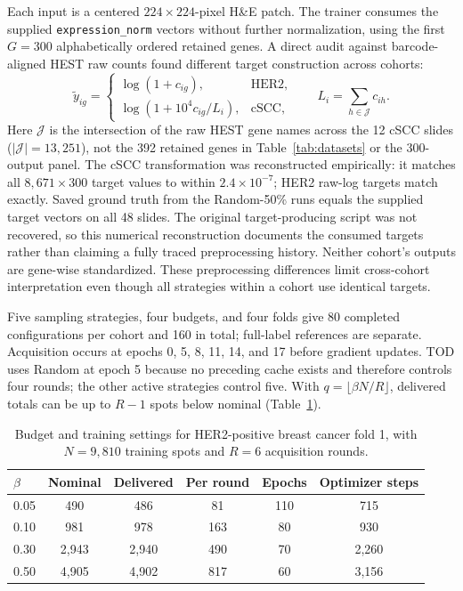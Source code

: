 \documentclass[]{spie}
\begin{document}
Each input is a centered $224\times224$-pixel H\&E patch. The trainer consumes the supplied \texttt{expression\_norm} vectors without further normalization, using the first $G=300$ alphabetically ordered retained genes. A direct audit against barcode-aligned HEST raw counts found different target construction across cohorts:
\begin{equation}
\tilde y_{ig}=\begin{cases}
\log(1+c_{ig}), & \text{HER2},\\[2pt]
\log\!\left(1+10^4 c_{ig}/L_i\right), & \text{cSCC},
\end{cases}\qquad
L_i=\sum_{h\in\mathcal J}c_{ih}.
\label{eq:targets}
\end{equation}
Here $\mathcal J$ is the intersection of the raw HEST gene names across the 12 cSCC slides ($|\mathcal J|=13{,}251$), not the 392 retained genes in Table~\ref{tab:datasets} or the 300-output panel. The cSCC transformation was reconstructed empirically: it matches all $8{,}671\times300$ target values to within $2.4\times10^{-7}$; HER2 raw-log targets match exactly. Saved ground truth from the Random-50\% runs equals the supplied target vectors on all 48 slides. The original target-producing script was not recovered, so this numerical reconstruction documents the consumed targets rather than claiming a fully traced preprocessing history. Neither cohort's outputs are gene-wise standardized. These preprocessing differences limit cross-cohort interpretation even though all strategies within a cohort use identical targets.

Five sampling strategies, four budgets, and four folds give 80 completed configurations per cohort and 160 in total; full-label references are separate. Acquisition occurs at epochs 0, 5, 8, 11, 14, and 17 before gradient updates. TOD uses Random at epoch 5 because no preceding cache exists and therefore controls four rounds; the other active strategies control five. With $q=\lfloor\beta N/R\rfloor$, delivered totals can be up to $R-1$ spots below nominal (Table~\ref{tab:protocol}).

\begin{table}[htbp]
\centering
\caption{Budget and training settings for HER2-positive breast cancer fold 1, with $N=9{,}810$ training spots and $R=6$ acquisition rounds.}
\label{tab:protocol}
\begin{tabular}{lccccc}
\hline
$\beta$ & Nominal & Delivered & Per round & Epochs & Optimizer steps \\
\hline
0.05 & 490 & 486 & 81 & 110 & 715 \\
0.10 & 981 & 978 & 163 & 80 & 930 \\
0.30 & 2,943 & 2,940 & 490 & 70 & 2,260 \\
0.50 & 4,905 & 4,902 & 817 & 60 & 3,156 \\
\hline
\end{tabular}
\end{table}
\end{document}
